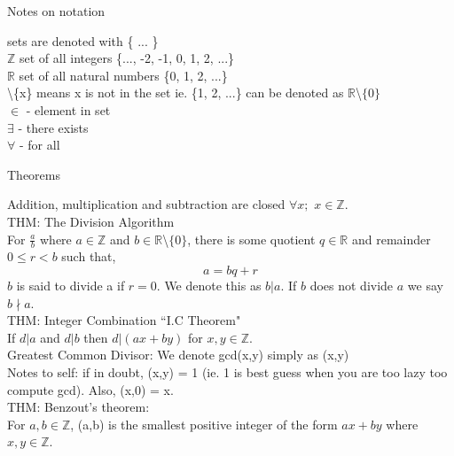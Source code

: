 \documentclass[12pt]{article}
\def \z{\mathbb{Z}}
\def \r{\mathbb{R}}
\def \n{\noindent}
\begin{document}
\begin{center} Notes on notation \end{center}

\n sets are denoted with \{ ... \}\\

\n $\z$ set of all integers \{..., -2, -1, 0, 1, 2, ...\}\\

\n $\r$ set of all natural numbers \{0, 1, 2, ...\}\\

\n \textbackslash \{x\} means x is not in the set ie. \{1, 2, ...\} can be denoted as $\r$\textbackslash$\{0\}$\\

\n $\in$ - element in set\\

\n $\exists$ - there exists\\

\n $\forall$ - for all

\begin{center} Theorems \end{center}

\n Addition, multiplication and subtraction are closed $\forall x;$ $x \in \z$.\\

\n THM: The Division Algorithm\\
\hangindent=1cm For $\frac ab$ where $a \in \z$ and $b \in \r$\textbackslash$\{0\}$, there is some quotient $q \in \r$ and remainder $0 \leq r < b$ such that,
\[ a = bq + r\]
$b$ is said to divide a if $r=0$. We denote this as $b|a$. If $b$ does not divide $a$ we say $b \nmid a$.\\

\n THM: Integer Combination ``I.C Theorem"\\
\hangindent=1cm If $d|a$ and $d|b$ then $d|(ax + by)$ for $x,y \in \z$.\\

\n Greatest Common Divisor: We denote gcd(x,y) simply as (x,y)\\
\hangindent=1cm Notes to self: if in doubt, (x,y) = 1 (ie. 1 is best guess when you are too lazy too compute gcd). Also, (x,0) = x.\\

\n THM: Benzout's theorem:\\
\hangindent=1cm For $a,b \in \z$, (a,b) is the smallest positive integer of the form $ax+by$ where $x,y \in \z$.\\
\end{document}
